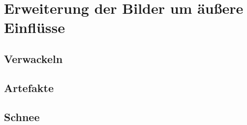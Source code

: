 \chapter{Erweiterung der Bilder um äußere Einflüsse}
\section{Verwackeln}
\section{Artefakte}
\section{Schnee}